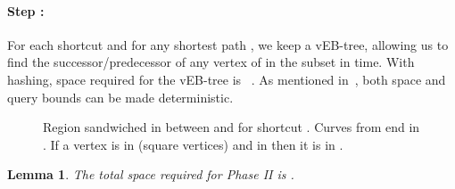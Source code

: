 \documentclass[11pt]{article}
\newtheorem{lemma}{Lemma}
\begin{document}
\paragraph{Step :} For each shortcut  and for any shortest path , we keep a vEB-tree, allowing us to find the successor/predecessor of any vertex of  in the subset  in  time. With hashing, space required for the vEB-tree is ~\cite{Predecessor,RangeQueries}. As mentioned in~\cite{Predecessor}, both space and query bounds can be made deterministic.
\begin{figure}\centerline{}
\caption{Region  sandwiched in between  and  for shortcut . Curves from  end in . If a vertex is in  (square vertices) and in  then it is in .}
\label{fig:PhaseIIData}
\end{figure}
\begin{lemma}\label{Lem:TypeIIAndIIIPortalSet}
The total space required for Phase II is .
\end{lemma}
\end{document}
